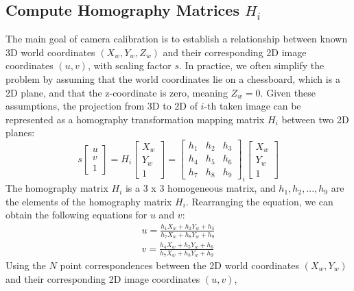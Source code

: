 \documentclass[12pt,letterpaper]{article}
\begin{document}
\subsection{Compute Homography Matrices $H_i$}
The main goal of camera calibration is to establish a relationship between known 3D world coordinates $(X_w, Y_w, Z_w)$ and their corresponding 2D image coordinates $(u, v)$, with scaling factor $s$. In practice, we often simplify the problem by assuming that the world coordinates lie on a chessboard, which is a 2D plane, and that the z-coordinate is zero, meaning $Z_w = 0$. Given these assumptions, the projection from 3D to 2D of $i$-th taken image can be represented as a homography transformation mapping matrix $H_i$ between two 2D planes:
\begin{equation}
    s\begin{bmatrix}
        u \\
        v \\
        1
    \end{bmatrix}
    = H_i \begin{bmatrix}
        X_w \\
        Y_w \\
        1
    \end{bmatrix}
    = \begin{bmatrix}
        h_1 & h_2 & h_3 \\
        h_4 & h_5 & h_6 \\
        h_7 & h_8 & h_9
    \end{bmatrix}_i
    \begin{bmatrix}
        X_w \\
        Y_w \\
        1
    \end{bmatrix}
\end{equation}
The homography matrix $H_i$ is a 3 x 3 homogeneous matrix, and $h_1, h_2, ..., h_9$ are the elements of the homography matrix $H_i$.
Rearranging the equation, we can obtain the following equations for $u$ and $v$:
\begin{equation}
    \begin{aligned}
        u = \frac{h_1X_w + h_2Y_w + h_3}{h_7X_w + h_8Y_w + h_9} \\
        v = \frac{h_4X_w + h_5Y_w + h_6}{h_7X_w + h_8Y_w + h_9}
    \end{aligned}
\end{equation}
Using the $N$ point correspondences between the 2D world coordinates $(X_w, Y_w)$ and their corresponding 2D image coordinates $(u, v)$,
\end{document}
